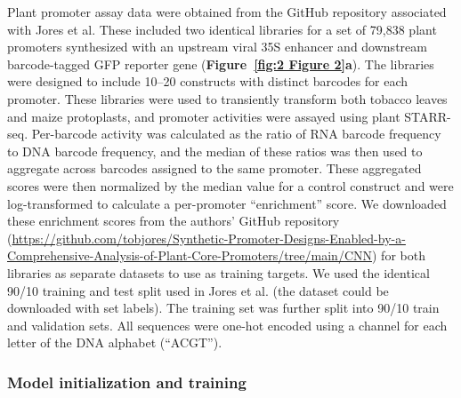 Plant promoter assay data were obtained from the GitHub repository associated with Jores et al. These included two identical libraries for a set of 79,838 plant promoters synthesized with an upstream viral 35S enhancer and downstream barcode-tagged GFP reporter gene (\textbf{Figure~\ref{fig:2 Figure 2}\textbf{a}}). The libraries were designed to include 10–20 constructs with distinct barcodes for each promoter. These libraries were used to transiently transform both tobacco leaves and maize protoplasts, and promoter activities were assayed using plant STARR-seq\cite{Jores2020-hm}. Per-barcode activity was calculated as the ratio of RNA barcode frequency to DNA barcode frequency, and the median of these ratios was then used to aggregate across barcodes assigned to the same promoter. These aggregated scores were then normalized by the median value for a control construct and were log-transformed to calculate a per-promoter “enrichment” score. We downloaded these enrichment scores from the authors’ GitHub repository (\url{https://github.com/tobjores/Synthetic-Promoter-Designs-Enabled-by-a-Comprehensive-Analysis-of-Plant-Core-Promoters/tree/main/CNN}) for both libraries as separate datasets to use as training targets. We used the identical 90/10 training and test split used in Jores et al. (the dataset could be downloaded with set labels). The training set was further split into 90/10 train and validation sets. All sequences were one-hot encoded using a channel for each letter of the DNA alphabet (“ACGT”).

\subsubsection{Model initialization and training}

